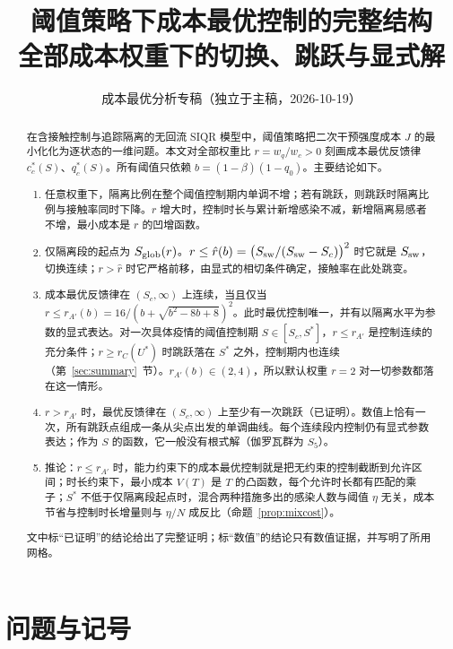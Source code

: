 \documentclass[11pt,a4paper]{ctexart}
\title{阈值策略下成本最优控制的完整结构\\[2pt]\large 全部成本权重下的切换、跳跃与显式解}
\author{成本最优分析专稿（独立于主稿，2026-10-19）}
\date{}
\theoremstyle{definition}
\theoremstyle{definition}
\newcommand{\Ssw}{S_{\rm sw}}
\newcommand{\rA}{r_{A'}}
\newcommand{\rhat}{\hat r}
\begin{document}
\maketitle

\begin{abstract}
\noindent 在含接触控制与追踪隔离的无回流 SIQR 模型中，阈值策略把二次干预强度成本 $J$ 的最小化化为逐状态的一维问题。本文对全部权重比 $r=w_q/w_c>0$ 刻画成本最优反馈律 $c_c^*(S)$、$q_c^*(S)$。所有阈值只依赖 $b=(1-\beta)(1-q_0)$。主要结论如下。
\begin{enumerate}
\item 任意权重下，隔离比例在整个阈值控制期内单调不增；若有跳跃，则跳跃时隔离比例与接触率同时下降。$r$ 增大时，控制时长与累计新增感染不减，新增隔离易感者不增，最小成本是 $r$ 的凹增函数。
\item 仅隔离段的起点为 $S_{\rm glob}(r)$。$r\le\rhat(b)=\bigl(\Ssw/(\Ssw-S_c)\bigr)^2$ 时它就是 $\Ssw$，切换连续；$r>\rhat$ 时它严格前移，由显式的相切条件确定，接触率在此处跳变。
\item 成本最优反馈律在 $(S_c,\infty)$ 上连续，当且仅当 $r\le\rA(b)=16/(b+\sqrt{b^2-8b+8})^2$。此时最优控制唯一，并有以隔离水平为参数的显式表达。对一次具体疫情的阈值控制期 $S\in[S_c,S^*]$，$r\le\rA$ 是控制连续的充分条件；$r\ge r_C(U^*)$ 时跳跃落在 $S^*$ 之外，控制期内也连续（第~\ref{sec:summary}~节）。$\rA(b)\in(2,4)$，所以默认权重 $r=2$ 对一切参数都落在这一情形。
\item $r>\rA$ 时，最优反馈律在 $(S_c,\infty)$ 上至少有一次跳跃（已证明）。数值上恰有一次，所有跳跃点组成一条从尖点出发的单调曲线。每个连续段内控制仍有显式参数表达；作为 $S$ 的函数，它一般没有根式解（伽罗瓦群为 $S_5$）。
\item 推论：$r\le\rA$ 时，能力约束下的成本最优控制就是把无约束的控制截断到允许区间；时长约束下，最小成本 $V(T)$ 是 $T$ 的凸函数，每个允许时长都有匹配的乘子；$S^*$ 不低于仅隔离段起点时，混合两种措施多出的感染人数与阈值 $\eta$ 无关，成本节省与控制时长增量则与 $\eta/N$ 成反比（命题~\ref{prop:mixcost}）。
\end{enumerate}
\noindent 文中标“已证明”的结论给出了完整证明；标“数值”的结论只有数值证据，并写明了所用网格。
\end{abstract}

\tableofcontents

\section{问题与记号}
\label{sec:setup}
\end{document}

